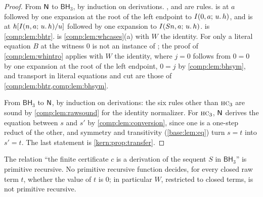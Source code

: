 \begin{proof}
From $\mathsf{N}$ to $\mathsf{BH}_3$, by induction on derivations. ,
 and  are rules.  is 
at $a$ followed by one expansion at the root of the left endpoint to
$I(0,a;\,u.\,h)$, and  is  at
$h[I(n,a;\,u.\,h)/u]$ followed by one expansion to
$I(S n,a;\,u.\,h)$.  is \cref{comp:lem:bhtr}. 
is \cref{comp:lem:whcases}(a) with $W$ the identity. For  only
a literal equation $B$ at the witness $0$ is not an instance of
; the proof of \cref{comp:lem:whintro} applies with $W$ the
identity, where $j=0$ follows from $0=0$ by one expansion at the root of the
left endpoint, $0=j$ by \cref{comp:lem:bhsym}, and transport in literal
equations and cut are those of \cref{comp:lem:bhtr,comp:lem:bhsym}.

From $\mathsf{BH}_3$ to $\mathsf{N}$, by induction on derivations: the six rules
other than $\rulename{HC}_3$ are sound by \cref{comp:lem:rawsound} for the
identity normalizer. For $\rulename{HC}_3$, $\mathsf{N}$ derives the equation
between $s$ and $s'$ by \cref{comp:lem:conversion}, since one is a one-step
reduct of the other, and symmetry and transitivity (\cref{base:lem:eq})
turn $s=t$ into $s'=t$. The last statement is \cref{kern:prop:transfer}.
\end{proof}

\begin{proposition}
\label{comp:prop:bhpr}
The relation ``the finite certificate $c$ is a derivation of the sequent
$S$ in $\mathsf{BH}_3$'' is primitive recursive. No primitive recursive
function decides, for every closed raw term $t$, whether the value of $t$ is
$0$; in particular $W$, restricted to closed terms, is not primitive
recursive.
\end{proposition}

